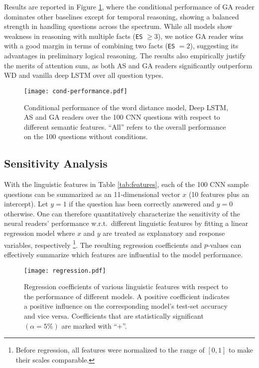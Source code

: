 \documentclass[11pt,a4paper]{article}
\begin{document}
Results are reported in Figure \ref{fig:cond-performance},
where the conditional performance of GA reader dominates other baselines except for temporal reasoning, showing a balanced strength in handling questions across the spectrum. While all models show weakness in reasoning with multiple facts (\texttt{ES} $\ge 3$), we notice GA reader wins with a good margin in terms of combining two facts (\texttt{ES} $=2$), suggesting its advantages in preliminary logical reasoning. The results also empirically justify the merits of attention sum, as both AS and GA readers significantly outperform WD and vanilla deep LSTM over all question types.

\begin{figure}[t]
\centering
\texttt{[image: cond-performance.pdf]}
\caption{Conditional performance of the word distance model, Deep LSTM, AS and GA readers over the 100 CNN questions with respect to different semantic features. ``All'' refers to the overall performance on the 100 questions without conditions.}
\label{fig:cond-performance}
\end{figure}

\subsection{Sensitivity Analysis}
With the linguistic features in Table \ref{tab:features}, each of the 100 CNN sample questions can be summarized as an 11-dimensional vector $x$ (10 features plus an intercept). Let $y = 1$ if the question has been correctly answered and $y=0$ otherwise. One can therefore quantitatively characterize the sensitivity of the neural readers' performance w.r.t.\ different linguistic features by fitting a linear regression model where $x$ and $y$ are treated as explanatory and response variables, respectively
\footnote{Before regression, all features were normalized to the range of $[0,1]$ to make their scales comparable.}.
The resulting regression coefficients and $p$-values can effectively summarize which features are influential to the model performance.

\begin{figure}[t]
\centering
\texttt{[image: regression.pdf]}
\caption{Regression coefficients of various linguistic features with respect to the performance of different models. A positive coefficient indicates a positive influence on the corresponding model's test-set accuracy and vice versa. Coefficients that are statistically significant $(\alpha= 5\%)$ are marked with ``$+$''.}
\label{fig:regression}
\end{figure}
\end{document}
